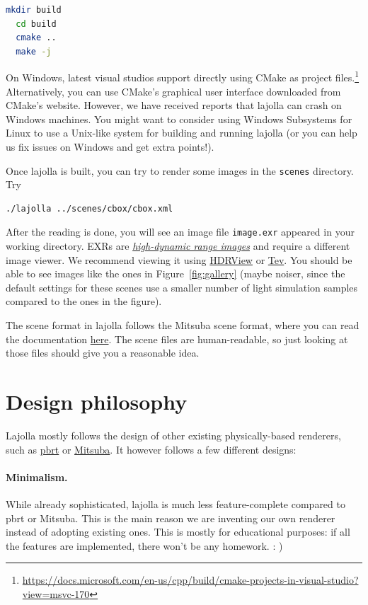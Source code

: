 \begin{lstlisting}[language=bash]
  mkdir build
  cd build
  cmake ..
  make -j
\end{lstlisting}

On Windows, latest visual studios support directly using CMake as project files.\footnote{\url{https://docs.microsoft.com/en-us/cpp/build/cmake-projects-in-visual-studio?view=msvc-170}} Alternatively, you can use CMake's graphical user interface downloaded from CMake's website. However, we have received reports that lajolla can crash on Windows machines. You might want to consider using Windows Subsystems for Linux to use a Unix-like system for building and running lajolla (or you can help us fix issues on Windows and get extra points!). 

Once lajolla is built, you can try to render some images in the \lstinline{scenes} directory. Try
\begin{lstlisting}[language=bash]
  ./lajolla ../scenes/cbox/cbox.xml
\end{lstlisting}

After the reading is done, you will see an image file \lstinline{image.exr} appeared in your working directory. EXRs are \href{https://en.wikipedia.org/wiki/High_dynamic_range}{\emph{high-dynamic range images}} and require a different image viewer. We recommend viewing it using \href{https://github.com/wkjarosz/hdrview}{HDRView} or \href{https://github.com/Tom94/tev}{Tev}. You should be able to see images like the ones in Figure~\ref{fig:gallery} (maybe noiser, since the default settings for these scenes use a smaller number of light simulation samples compared to the ones in the figure).

The scene format in lajolla follows the Mitsuba scene format, where you can read the documentation \href{https://www.mitsuba-renderer.org/releases/current/documentation.pdf}{here}. The scene files are human-readable, so just looking at those files should give you a reasonable idea.

\section{Design philosophy}

Lajolla mostly follows the design of other existing physically-based renderers, such as \href{https://github.com/mmp/pbrt-v3/}{pbrt} or \href{http://www.mitsuba-renderer.org/}{Mitsuba}. It however follows a few different designs:

\paragraph{Minimalism.} While already sophisticated, lajolla is much less feature-complete compared to pbrt or Mitsuba. This is the main reason we are inventing our own renderer instead of adopting existing ones. This is mostly for educational purposes: if all the features are implemented, there won't be any homework. : )

